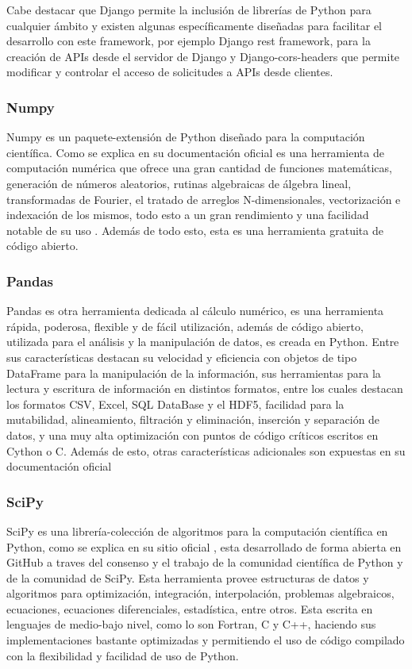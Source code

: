 Cabe destacar que Django permite la inclusión de librerías de Python para
cualquier ámbito y existen algunas específicamente diseñadas para facilitar el
desarrollo con este framework, por ejemplo Django rest framework, para la
creación de APIs desde el servidor de Django  y Django-cors-headers que permite
modificar y controlar el acceso de solicitudes a APIs desde clientes.

\subsubsection{Numpy}

Numpy es un paquete-extensión de Python diseñado para la computación
científica. Como se explica en su documentación oficial \cite{Numpy} es una
herramienta de computación numérica que ofrece una gran cantidad de  funciones
matemáticas, generación de números aleatorios, rutinas algebraicas de álgebra
lineal, transformadas de Fourier, el tratado de arreglos N-dimensionales,
vectorización e indexación de los mismos, todo esto a un gran rendimiento y una
facilidad notable de su uso . Además de todo esto, esta es una herramienta
gratuita de código abierto.

\subsubsection{Pandas}

Pandas es otra herramienta dedicada al cálculo numérico, es una herramienta
rápida, poderosa, flexible y de fácil utilización, además de código abierto,
utilizada para el análisis y la manipulación de datos, es creada en Python.
Entre sus características destacan su velocidad y eficiencia con objetos de
tipo DataFrame para la manipulación de la información, sus herramientas para la
lectura y escritura de información en distintos formatos, entre los cuales
destacan los formatos CSV, Excel, SQL DataBase y el HDF5, facilidad para la
mutabilidad, alineamiento, filtración y eliminación, inserción y separación de
datos, y una muy alta optimización con puntos de código críticos escritos en
Cython o C. Además de esto, otras características adicionales son expuestas en
su documentación oficial \cite{PandasDocs}

\subsubsection{SciPy}
SciPy es una librería-colección de algoritmos para la computación científica en
Python, como se explica en su sitio oficial \cite{Scipy}, esta desarrollado de
forma abierta en GitHub a traves del consenso y el trabajo de la comunidad
científica de Python y de la comunidad de SciPy. Esta herramienta provee estructuras
de datos y
algoritmos para optimización, integración, interpolación, problemas algebraicos,
ecuaciones, ecuaciones diferenciales, estadística, entre otros. Esta escrita
en lenguajes de medio-bajo nivel, como lo son Fortran, C y C++, haciendo sus
implementaciones bastante optimizadas y permitiendo el uso de código compilado
con la flexibilidad y facilidad de uso de Python.

